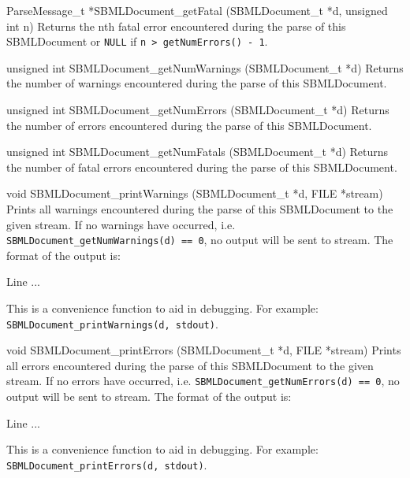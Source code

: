 \documentclass{cekmanual}
\begin{document}
\begin{methoddef}{ParseMessage\_t *SBMLDocument\_getFatal (SBMLDocument\_t *d,
unsigned int n)}
   Returns the nth fatal error encountered during the parse of this
   SBMLDocument or \texttt{NULL} if \texttt{n > getNumErrors() - 1}.
 \end{methoddef}


\begin{methoddef}{unsigned int SBMLDocument\_getNumWarnings
(SBMLDocument\_t *d)}
   Returns the number of warnings encountered during the parse of this
   SBMLDocument.
 \end{methoddef}

\begin{methoddef}{unsigned int SBMLDocument\_getNumErrors (SBMLDocument\_t *d)}
   Returns the number of errors encountered during the parse of this
   SBMLDocument.
 \end{methoddef}

\begin{methoddef}{unsigned int SBMLDocument\_getNumFatals (SBMLDocument\_t *d)}
   Returns the number of fatal errors encountered during the parse of this
   SBMLDocument.
 \end{methoddef}
  

\begin{methoddef}{void SBMLDocument\_printWarnings (SBMLDocument\_t *d,
FILE *stream)}
  Prints all warnings encountered during the parse of this SBMLDocument to
  the given stream.  If no warnings have occurred, i.e.
  \texttt{SBMLDocument\_getNumWarnings(d) == 0}, no output will be sent to
  stream. The format of the output is:
  \begin{example}
      Line %
      ...
  \end{example}
  This is a convenience function to aid in debugging.  For example:
  \texttt{SBMLDocument\_printWarnings(d, stdout)}.
 \end{methoddef}
  

\begin{methoddef}{void SBMLDocument\_printErrors (SBMLDocument\_t *d,
FILE *stream)}
  Prints all errors encountered during the parse of this SBMLDocument
  to the given stream.  If no errors have occurred, i.e.
  \texttt{SBMLDocument\_getNumErrors(d) == 0}, no output will be sent
  to stream. The format of the output is:
  \begin{example}
      Line %
      ...
  \end{example}
  This is a convenience function to aid in debugging.  For example:
  \texttt{SBMLDocument\_printErrors(d, stdout)}.
 \end{methoddef}
  
\end{document}
